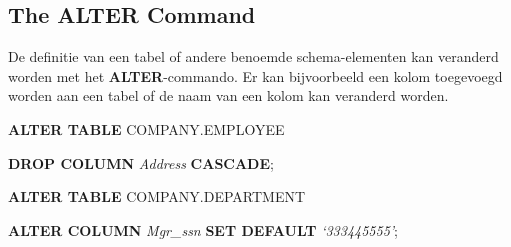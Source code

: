 \subsection{The ALTER Command}
De definitie van een tabel of andere benoemde schema-elementen kan veranderd worden met het \textbf{ALTER}-commando. Er kan bijvoorbeeld een kolom toegevoegd worden aan een tabel of de naam van een kolom kan veranderd worden.

\vspace{1mm}\hspace{10mm}
\textbf{ALTER TABLE} COMPANY.EMPLOYEE

\hspace{20mm}
\textbf{DROP COLUMN} \textit{Address} \textbf{CASCADE};

\vspace{1mm}\hspace{10mm}
\textbf{ALTER TABLE} COMPANY.DEPARTMENT

\hspace{20mm}
\textbf{ALTER COLUMN} \textit{Mgr\_ssn} \textbf{SET DEFAULT} \textit{`333445555'};
